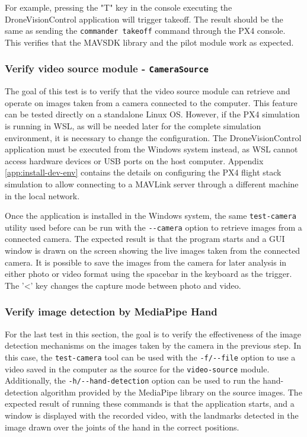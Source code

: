 For example, pressing the "T" key in the console executing the DroneVisionControl application will trigger takeoff. The result should be the same as sending the \texttt{commander takeoff} command through the PX4 console. This verifies that the MAVSDK library and the pilot module work as expected.

\subsubsection{Verify video source module - \texttt{CameraSource}}

The goal of this test is to verify that the video source module can retrieve and operate on images taken from a camera connected to the computer. This feature can be tested directly on a standalone Linux OS. However, if the PX4 simulation is running in WSL, as will be needed later for the complete simulation environment, it is necessary to change the configuration. The DroneVisionControl application must be executed from the Windows system instead, as WSL cannot access hardware devices or USB ports on the host computer. Appendix \ref{app:install-dev-env} contains the details on configuring the PX4 flight stack simulation to allow connecting to a MAVLink server through a different machine in the local network.

Once the application is installed in the Windows system, the same \texttt{test-camera} utility used before can be run with the \texttt{-{}-camera} option to retrieve images from a connected camera. The expected result is that the program starts and a GUI window is drawn on the screen showing the live images taken from the connected camera. It is possible to save the images from the camera for later analysis in either photo or video format using the spacebar in the keyboard as the trigger. The '<' key changes the capture mode between photo and video.


\subsubsection{Verify image detection by MediaPipe Hand}

For the last test in this section, the goal is to verify the effectiveness of the image detection mechanisms on the images taken by the camera in the previous step. In this case, the \texttt{test-camera} tool can be used with the \texttt{-f/-{}-file} option to use a video saved in the computer as the source for the \texttt{video-source} module. Additionally, the \texttt{-h/-{}-hand-detection} option can be used to run the hand-detection algorithm provided by the MediaPipe library on the source images. The expected result of running these commands is that the application starts, and a window is displayed with the recorded video, with the landmarks detected in the image drawn over the joints of the hand in the correct positions.

